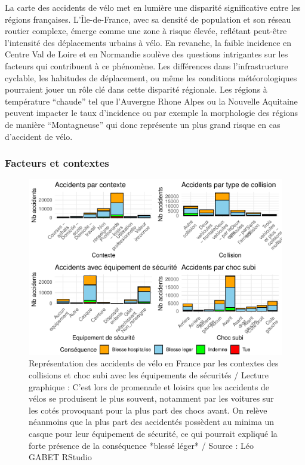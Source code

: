 \documentclass[french,]{compterendu}
\theoremstyle{urcastyle}
\theoremstyle{remark}
\begin{document}
La carte des accidents de vélo met en lumière une disparité significative entre les régions françaises. L'Île-de-France, avec sa densité de population et son réseau routier complexe, émerge comme une zone à risque élevée, reflétant peut-être l'intensité des déplacements urbains à vélo. En revanche, la faible incidence en Centre Val de Loire et en Normandie soulève des questions intrigantes sur les facteurs qui contribuent à ce phénomène. Les différences dans l'infrastructure cyclable, les habitudes de déplacement, ou même les conditions météorologiques pourraient jouer un rôle clé dans cette disparité régionale. Les régions à température ``chaude'' tel que l'Auvergne Rhone Alpes ou la Nouvelle Aquitaine peuvent impacter le taux d'incidence ou par exemple la morphologie des régions de manière ``Montagneuse'' qui donc représente un plus grand risque en cas d'accident de vélo.

\hypertarget{facteurs-et-contextes}{%
\subsubsection{Facteurs et contextes}\label{facteurs-et-contextes}}

\begin{figure}[H]

{\centering \includegraphics[width=0.9\linewidth]{Rapport_ADD_LEO-GABET_files/figure-latex/accCONTEXTE-1} 

}

\caption{Représentation des accidents de vélo en France par les contextes des collisions et choc subi avec les équipements de sécurités / Lecture graphique : C'est lors de promenade et loisirs que les accidents de vélos se produisent le plus souvent, notamment par les voitures sur les cotés provoquant pour la plus part des chocs avant. On relève néanmoins que la plus part des accidentés possèdent au minima un casque pour leur équipement de sécurité, ce qui pourrait expliqué la forte présence de la conséquence *blessé léger* / Source : Léo GABET RStudio}\label{fig:accCONTEXTE}
\end{figure}
\end{document}
